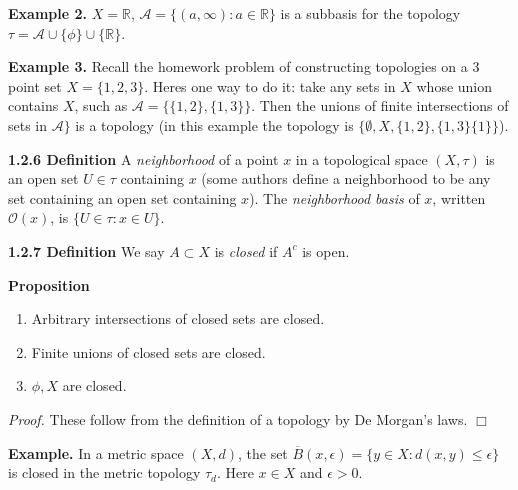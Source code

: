 \documentclass[12pt]{article}
\newcommand{\reals}[0] { \mathbb{R}}
\newcommand{\eps}[0] {  \epsilon }
\newcommand{\A}[0] { \mathcal{A} }
\newcommand{\curlyO}[0] { \mathcal{O} }
\begin{document}
\begin{flushleft} {\bf Example 2.} $X = \reals$, $\A = \{ (a, \infty) :
 a \in \reals \}$ is a subbasis for
the topology $\tau = \A \cup \{ \phi \} \cup \{ \reals \} $.
\end{flushleft}

\begin{flushleft} {\bf Example 3.}  Recall the homework problem
of constructing topologies on a 3 point set $X = \{ 1 , 2, 3 \}$.
Heres one way to do it: take any sets in $X$ whose union contains
$X$, such as $\A = \{ \{ 1, 2 \} , \{ 1 , 3 \} \}$.  Then
the unions of finite intersections of sets in $\A \}$ is a topology
(in this example the topology is $\{ \emptyset , X ,
\{ 1, 2 \} , \{ 1 , 3 \} \{ 1 \} \}$).
\end{flushleft}


\begin{flushleft} { \bf 1.2.6 Definition } A \emph{neighborhood} of a point $x$ in a topological space $(X, \tau)$ is an open set $U \in \tau$ containing $x$ (some authors define a neighborhood to be  any set containing an open set containing  $x$). The \emph{neighborhood basis} of $x$, written $\curlyO(x)$,  is $\{ U \in \tau :  x \in U\}$.
\end{flushleft}


\begin{flushleft}
 { \bf 1.2.7 Definition }We say $A \subset X$ is \emph{closed} if $A^c$ is open.\end{flushleft}\begin{flushleft}
 { \bf Proposition }\begin{enumerate}
\item
                Arbitrary intersections of closed sets are closed.
            \item
                Finite unions of closed sets are closed.
            \item
                $\phi, X$ are closed.
            \end{enumerate}\begin{flushleft}
 \emph{Proof.  } These follow from the definition of a
topology by De Morgan's laws. $\Box$
  \end{flushleft}\end{flushleft}\begin{flushleft}
 { \bf Example.} In a metric space $(X, d)$, the set
$\overline{B}(x, \eps) = \{ y \in X :  d(x,y) \le \eps \}$ is
closed in the metric topology $\tau_d$. Here $x \in X$ and $\eps > 0$.
\end{flushleft}
\end{document}
